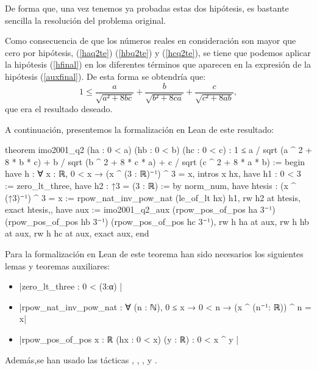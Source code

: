 \begin{demostracion}
  De forma que, una vez tenemos ya probadas estas dos hipótesis, es
  bastante sencilla la resolución del problema original.

  Como consecuencia de que los números reales en consideración son mayor
  que cero por hipótesis, (\ref{haq2te}) (\ref{hbq2te}) y
  (\ref{hcq2te}), se tiene que podemos aplicar la hipótesis
  (\ref{hfinal}) en los diferentes términos que aparecen en la expresión
  de la hipótesis (\ref{auxfinal}).  De esta forma se obtendría que:
  \begin{equation}
    1 ≤ \frac{a}{\sqrt{a²+8bc}}+\frac{b}{\sqrt{b²+8ca}}+
        \frac{c}{\sqrt{c²+8ab}},
  \end{equation}
  que era el resultado deseado.
\end{demostracion}

A continuación, presentemos la formalización en Lean de este resultado:

\begin{leancode}
theorem imo2001_q2
  (ha : 0 < a)
  (hb : 0 < b)
  (hc : 0 < c)
  : 1 ≤ a / sqrt (a ^ 2 + 8 * b * c) +
        b / sqrt (b ^ 2 + 8 * c * a) +
        c / sqrt (c ^ 2 + 8 * a * b) :=
begin
  have h : ∀ {x : ℝ}, 0 < x → (x ^ (3 : ℝ)⁻¹) ^ 3 = x,
    { intros x hx,
      have h1 : 0 < 3 :=
        zero_lt_three,
      have h2 : ↑3 = (3 : ℝ) :=
        by norm_num,
      have htesis : (x ^ (↑3)⁻¹) ^ 3 = x :=
        rpow_nat_inv_pow_nat (le_of_lt hx) h1,
      rw h2 at htesis,
      exact htesis,},
  have aux :=
    imo2001_q2_aux (rpow_pos_of_pos ha 3⁻¹)
                   (rpow_pos_of_pos hb 3⁻¹)
                   (rpow_pos_of_pos hc 3⁻¹),
  rw h ha at aux,
  rw h hb at aux,
  rw h hc at aux,
  exact aux,
end
\end{leancode}

Para la formalización en Lean de este teorema han sido necesarios los
siguientes lemas y teoremas auxiliares:
\begin{itemize}
\item {}|zero_lt_three : 0 < (3:α) |
\item {}|rpow_nat_inv_pow_nat : ∀ (n : ℕ), 0 ≤ x → 0 < n →
(x ^ (n⁻¹: ℝ)) ^ n = x|
\item {}|rpow_pos_of_pos {x : ℝ} (hx : 0 < x) (y : ℝ) : 0 < x ^ y |
\end{itemize}

Además,se han usado las tácticas
,
,
,
 y
.
